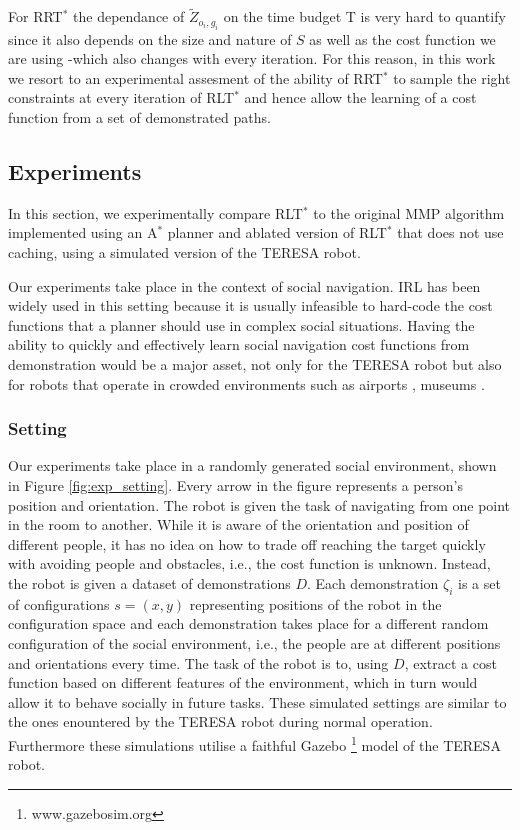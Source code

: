 \documentclass[a4paper,11pt]{report}
\begin{document}


For RRT$^*$ the dependance of $\tilde{Z}_{o_i,g_i}$ on the time budget T is very hard to quantify since it also depends on the size and nature of $S$ as well as the cost function we are using -which also changes with every iteration. For this reason, in this work we resort to an experimental assesment of the ability of RRT$^*$ to sample the right constraints at every iteration of RLT$^*$ and hence allow the learning of a cost function from a set of demonstrated paths.


\subsection{Experiments}
In this section, we experimentally compare RLT$^*$ to the original MMP algorithm implemented using an A$^*$ planner and ablated version of RLT$^*$ that does not use caching, using a simulated version of the TERESA robot. 
	
	Our experiments take place in the context of social navigation. IRL has been widely used in this setting \cite{okallearning,henry2010learning,vasquez2014inverse} because it is usually infeasible to hard-code the cost functions that a planner should use in complex social situations. Having the ability to quickly and effectively learn social navigation cost functions from demonstration would be a major asset, not only for the TERESA robot but also for robots that operate in crowded environments such as airports \cite{triebel2015spencer}, museums \cite{thrun1999minerva}.
	
\subsubsection{Setting}
	Our experiments take place in a randomly generated social environment, shown in Figure \ref{fig:exp_setting}. Every arrow in the figure represents a person's position and orientation. The robot is given the task of navigating from one point in the room to another. While it is aware of the orientation and position of different people, it has no idea on how to trade off reaching the target quickly with avoiding people and obstacles, i.e., the cost function is unknown. Instead, the robot is given a dataset of demonstrations $D$. Each demonstration $\zeta_i$ is a set of configurations $s = (x,y)$ representing positions of the robot in the configuration space and each demonstration takes place for a different random configuration of the social environment, i.e., the people are at different positions and orientations every time. The task of the robot is to, using $D$, extract a cost function based on different features of the environment, which in turn would allow it to behave socially in future tasks. These simulated settings are similar to the ones enountered by the TERESA robot during normal operation. Furthermore these simulations utilise a faithful Gazebo \footnote{www.gazebosim.org} model of the TERESA robot.
\end{document}
